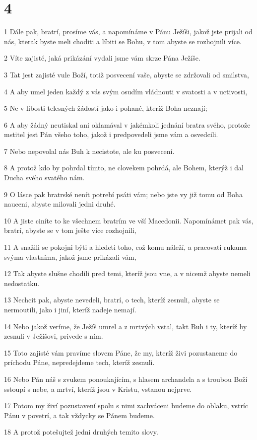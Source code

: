 \chapter{4}

\par 1 Dále pak, bratrí, prosíme vás, a napomínáme v Pánu Ježíši, jakož jste prijali od nás, kterak byste meli choditi a líbiti se Bohu, v tom abyste se rozhojnili více.
\par 2 Víte zajisté, jaká prikázání vydali jsme vám skrze Pána Ježíše.
\par 3 Tat jest zajisté vule Boží, totiž posvecení vaše, abyste se zdržovali od smilstva,
\par 4 A aby umel jeden každý z vás svým osudím vládnouti v svatosti a v uctivosti,
\par 5 Ne v libosti telesných žádostí jako i pohané, kteríž Boha neznají;
\par 6 A aby žádný neutiskal ani oklamával v jakémkoli jednání bratra svého, protože mstitel jest Pán všeho toho, jakož i predpovedeli jsme vám a osvedcili.
\par 7 Nebo nepovolal nás Buh k necistote, ale ku posvecení.
\par 8 A protož kdo by pohrdal tímto, ne clovekem pohrdá, ale Bohem, kterýž i dal Ducha svého svatého nám.
\par 9 O lásce pak bratrské nenít potrebí psáti vám; nebo jste vy již tomu od Boha nauceni, abyste milovali jedni druhé.
\par 10 A jiste ciníte to ke všechnem bratrím ve vší Macedonii. Napomínámet pak vás, bratrí, abyste se v tom ješte více rozhojnili,
\par 11 A snažili se pokojni býti a hledeti toho, což komu náleží, a pracovati rukama svýma vlastníma, jakož jsme prikázali vám,
\par 12 Tak abyste slušne chodili pred temi, kteríž jsou vne, a v nicemž abyste nemeli nedostatku.
\par 13 Nechcit pak, abyste nevedeli, bratrí, o tech, kteríž zesnuli, abyste se nermoutili, jako i jiní, kteríž nadeje nemají.
\par 14 Nebo jakož veríme, že Ježíš umrel a z mrtvých vstal, takt Buh i ty, kteríž by zesnuli v Ježíšovi, privede s ním.
\par 15 Toto zajisté vám pravíme slovem Páne, že my, kteríž živi pozustaneme do príchodu Páne, nepredejdeme tech, kteríž zesnuli.
\par 16 Nebo Pán náš s zvukem ponoukajícím, s hlasem archandela a s troubou Boží sstoupí s nebe, a mrtví, kteríž jsou v Kristu, vstanou nejprve.
\par 17 Potom my živí pozustavení spolu s nimi zachváceni budeme do oblaku, vstríc Pánu v povetrí, a tak vždycky se Pánem budeme.
\par 18 A protož potešujtež jedni druhých temito slovy.

